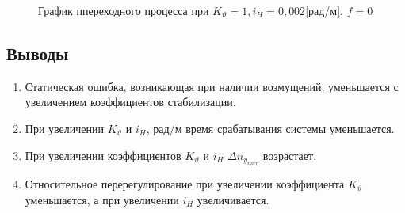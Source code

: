 \documentclass[a4paper,12pt]{article}
\begin{document}
    \begin{figure}[H]
        \caption{График ппереходного процесса при $K_{\vartheta}=1, i_H=0,002$[рад/м], $f=0$}
        \label{fig:Переходный процесс 2}
    \end{figure}

    \subsection{Выводы}
    \begin{enumerate}
        \item Статическая ошибка, возникающая при наличии возмущений, уменьшается с увеличением коэффициентов стабилизации.
        \item При увеличении $K_{\vartheta}$  и $i_H$, рад/м время срабатывания системы уменьшается.
        \item При увеличении коэффициентов $K_{\vartheta}$  и $i_H$ $\Delta n_{y_{max}}$ возрастает. 
        \item Относительное перерегулирование при увеличении коэффициента $K_{\vartheta}$ уменьшается, а при увеличении $i_H$ увеличивается.
    \end{enumerate}
\end{document}
